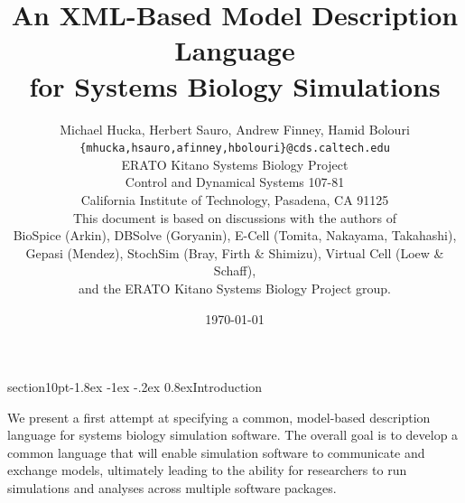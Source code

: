 \documentclass[10pt]{article}
\makeatletter
\renewcommand{\section}{\@startsection%
  {section}{1}{0pt}{-1.8ex \@plus -1ex \@minus -.2ex}%
  {0.8ex}{\normalfont\Large\bfseries}}
\makeatother
\begin{document}

\thispagestyle{fancy}

\title{\textbf{An XML-Based Model Description Language\\
    for Systems Biology Simulations}}

\author{Michael Hucka, Herbert Sauro, Andrew Finney, Hamid Bolouri\\
\normalsize\texttt{\{mhucka,hsauro,afinney,hbolouri\}@cds.caltech.edu}\\[-2pt]
\normalsize ERATO Kitano Systems Biology Project\\[-2pt]
\normalsize Control and Dynamical Systems 107-81\\[-2pt]
\normalsize California Institute of Technology, Pasadena, CA 91125\\[10pt]
\normalsize This document is based on discussions with the authors of\\[-2pt]
\normalsize BioSpice (Arkin), DBSolve (Goryanin), E-Cell (Tomita, Nakayama, Takahashi),\\[-2pt]
\normalsize Gepasi (Mendez), StochSim (Bray, Firth \& Shimizu), Virtual Cell (Loew \& Schaff),\\[-2pt]
\normalsize and the ERATO Kitano Systems Biology Project group.}

\date{\today{}}

\maketitle

\thispagestyle{fancy}

\vspace*{0.5 in}


\section{Introduction} 
\label{sec:introduction}

We present a first attempt at specifying a common, model-based description
language for systems biology simulation software.  The overall goal is to
develop a common language that will enable simulation software to
communicate and exchange models, ultimately leading to the ability for
researchers to run simulations and analyses across multiple software
packages.
\end{document}
